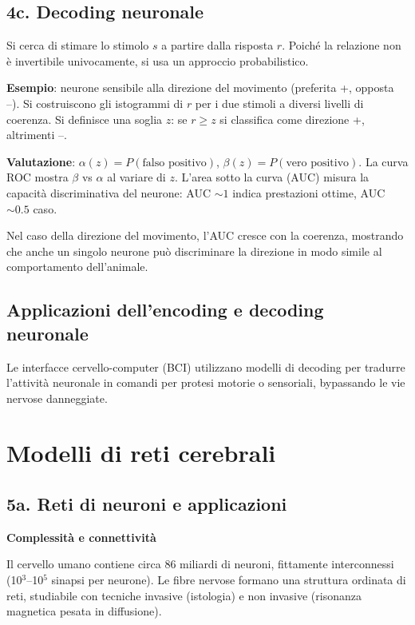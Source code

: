 \documentclass[12pt,a4paper,openany]{book}
\begin{document}
\section{4c. Decoding neuronale}

Si cerca di stimare lo stimolo $s$ a partire dalla risposta $r$. Poiché la relazione non è invertibile univocamente, si usa un approccio probabilistico.

\textbf{Esempio}: neurone sensibile alla direzione del movimento (preferita +, opposta --). Si costruiscono gli istogrammi di $r$ per i due stimoli a diversi livelli di coerenza. Si definisce una soglia $z$: se $r \ge z$ si classifica come direzione +, altrimenti --.

\textbf{Valutazione}: $\alpha(z) = P(\text{falso positivo})$, $\beta(z) = P(\text{vero positivo})$. La curva ROC mostra $\beta$ vs $\alpha$ al variare di $z$. L'area sotto la curva (AUC) misura la capacità discriminativa del neurone: AUC $\sim 1$ indica prestazioni ottime, AUC $\sim 0.5$ caso.

Nel caso della direzione del movimento, l'AUC cresce con la coerenza, mostrando che anche un singolo neurone può discriminare la direzione in modo simile al comportamento dell'animale.

\section{Applicazioni dell'encoding e decoding neuronale}

Le interfacce cervello-computer (BCI) utilizzano modelli di decoding per tradurre l'attività neuronale in comandi per protesi motorie o sensoriali, bypassando le vie nervose danneggiate.

\chapter{Modelli di reti cerebrali}

\section{5a. Reti di neuroni e applicazioni}

\textbf{Complessità e connettività}

Il cervello umano contiene circa 86 miliardi di neuroni, fittamente interconnessi (10$^3$--10$^5$ sinapsi per neurone). Le fibre nervose formano una struttura ordinata di reti, studiabile con tecniche invasive (istologia) e non invasive (risonanza magnetica pesata in diffusione).
\end{document}
